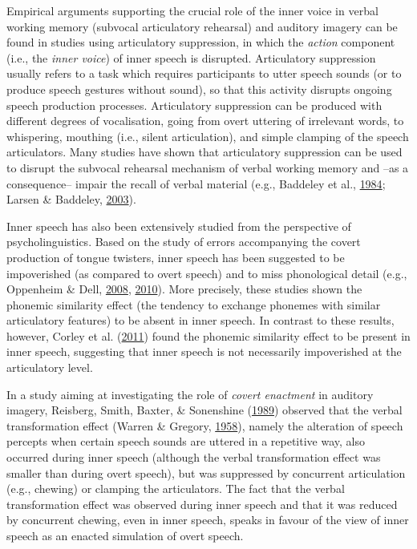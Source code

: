 \documentclass[a4paper,12pt,twoside,openright,oldfontcommands,final]{memoir}
\begin{document}
Empirical arguments supporting the crucial role of the inner voice in verbal working memory (subvocal articulatory rehearsal) and auditory imagery can be found in studies using articulatory suppression, in which the \emph{action} component (i.e., the \emph{inner voice}) of inner speech is disrupted. Articulatory suppression usually refers to a task which requires participants to utter speech sounds (or to produce speech gestures without sound), so that this activity disrupts ongoing speech production processes. Articulatory suppression can be produced with different degrees of vocalisation, going from overt uttering of irrelevant words, to whispering, mouthing (i.e., silent articulation), and simple clamping of the speech articulators. Many studies have shown that articulatory suppression can be used to disrupt the subvocal rehearsal mechanism of verbal working memory and --as a consequence-- impair the recall of verbal material (e.g., Baddeley et al., \protect\hyperlink{ref-baddeley_exploring_1984}{1984}; Larsen \& Baddeley, \protect\hyperlink{ref-larsen_disruption_2003}{2003}).

Inner speech has also been extensively studied from the perspective of psycholinguistics. Based on the study of errors accompanying the covert production of tongue twisters, inner speech has been suggested to be impoverished (as compared to overt speech) and to miss phonological detail (e.g., Oppenheim \& Dell, \protect\hyperlink{ref-oppenheim_inner_2008}{2008}, \protect\hyperlink{ref-oppenheim_motor_2010}{2010}). More precisely, these studies shown the phonemic similarity effect (the tendency to exchange phonemes with similar articulatory features) to be absent in inner speech. In contrast to these results, however, Corley et al. (\protect\hyperlink{ref-corley_error_2011}{2011}) found the phonemic similarity effect to be present in inner speech, suggesting that inner speech is not necessarily impoverished at the articulatory level.

In a study aiming at investigating the role of \emph{covert enactment} in auditory imagery, Reisberg, Smith, Baxter, \& Sonenshine (\protect\hyperlink{ref-reisberg_enacted_1989}{1989}) observed that the verbal transformation effect (Warren \& Gregory, \protect\hyperlink{ref-warren_auditory_1958}{1958}), namely the alteration of speech percepts when certain speech sounds are uttered in a repetitive way, also occurred during inner speech (although the verbal transformation effect was smaller than during overt speech), but was suppressed by concurrent articulation (e.g., chewing) or clamping the articulators. The fact that the verbal transformation effect was observed during inner speech and that it was reduced by concurrent chewing, even in inner speech, speaks in favour of the view of inner speech as an enacted simulation of overt speech.
\end{document}
